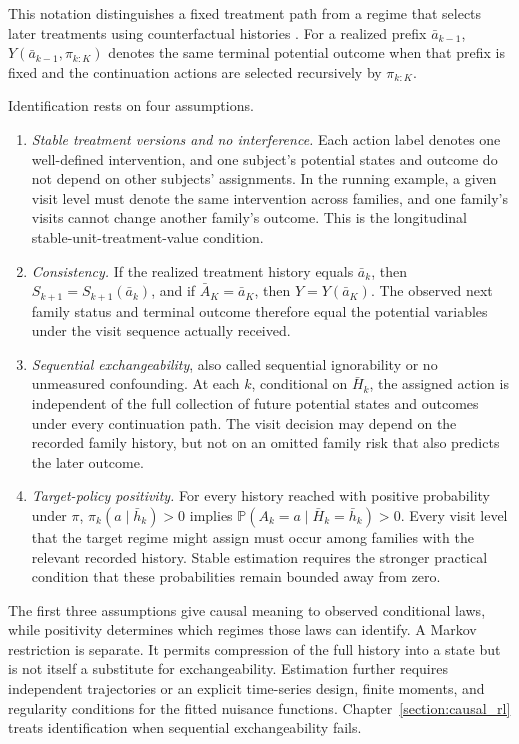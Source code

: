 This notation distinguishes a fixed treatment path from a regime that selects later treatments using counterfactual histories \citep{murphy2003dtr, schulte2014qlearning}.
For a realized prefix $\bar a_{k-1}$,
$Y(\bar a_{k-1},\pi_{k:K})$ denotes the same terminal potential
outcome when that prefix is fixed and the continuation actions are selected
recursively by $\pi_{k:K}$.

Identification rests on four assumptions.
\begin{enumerate}
\item \emph{Stable treatment versions and no interference.} Each action label denotes one well-defined intervention, and one subject's potential states and outcome do not depend on other subjects' assignments. In the running example, a given visit level must denote the same intervention across families, and one family's visits cannot change another family's outcome. This is the longitudinal stable-unit-treatment-value condition.
\item \emph{Consistency.} If the realized treatment history equals $\bar a_k$, then $S_{k+1}=S_{k+1}(\bar a_k)$, and if $\bar A_K=\bar a_K$, then $Y=Y(\bar a_K)$. The observed next family status and terminal outcome therefore equal the potential variables under the visit sequence actually received.
\item \emph{Sequential exchangeability}, also called sequential ignorability or no unmeasured confounding. At each $k$, conditional on $\bar H_k$, the assigned action is independent of the full collection of future potential states and outcomes under every continuation path. The visit decision may depend on the recorded family history, but not on an omitted family risk that also predicts the later outcome.
\item \emph{Target-policy positivity.} For every history reached with positive probability under $\pi$, $\pi_k(a\mid\bar h_k)>0$ implies $\mathbb P(A_k=a\mid\bar H_k=\bar h_k)>0$. Every visit level that the target regime might assign must occur among families with the relevant recorded history. Stable estimation requires the stronger practical condition that these probabilities remain bounded away from zero.
\end{enumerate}
The first three assumptions give causal meaning to observed conditional laws, while positivity determines which regimes those laws can identify. A Markov restriction is separate. It permits compression of the full history into a state but is not itself a substitute for exchangeability. Estimation further requires independent trajectories or an explicit time-series design, finite moments, and regularity conditions for the fitted nuisance functions. Chapter~\ref{section:causal_rl} treats identification when sequential exchangeability fails.

